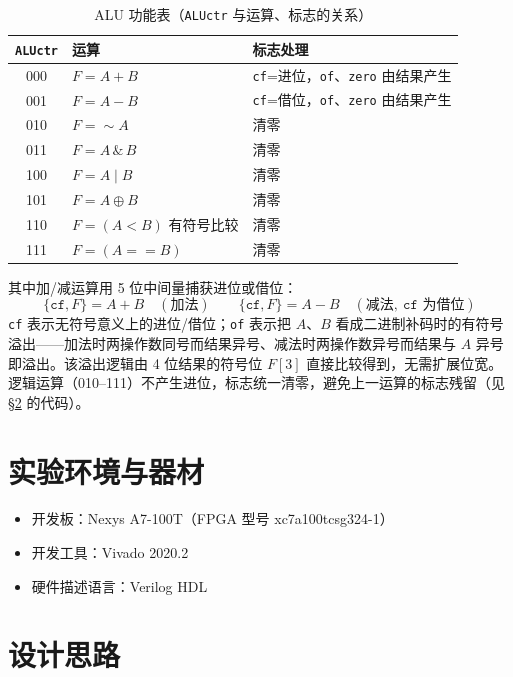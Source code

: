 \documentclass[12pt, a4paper]{ctexart}
\begin{document}
\begin{table}[htbp]
    \centering
    \caption{ALU 功能表（\texttt{ALUctr} 与运算、标志的关系）}
    \label{tab:alu}
    \begin{tabular}{cll}
        \hline
        \texttt{ALUctr} & 运算 & 标志处理 \\
        \hline
        000 & $F = A + B$        & \texttt{cf}=进位，\texttt{of}、\texttt{zero} 由结果产生 \\
        001 & $F = A - B$        & \texttt{cf}=借位，\texttt{of}、\texttt{zero} 由结果产生 \\
        010 & $F = \sim A$       & 清零 \\
        011 & $F = A \,\&\, B$   & 清零 \\
        100 & $F = A \mid B$     & 清零 \\
        101 & $F = A \oplus B$   & 清零 \\
        110 & $F = (A < B)$ 有符号比较 & 清零 \\
        111 & $F = (A == B)$     & 清零 \\
        \hline
    \end{tabular}
\end{table}

\noindent 其中加/减运算用 5 位中间量捕获进位或借位：
\begin{equation*}
    \{\texttt{cf}, F\} = A + B \quad(\text{加法})\qquad
    \{\texttt{cf}, F\} = A - B \quad(\text{减法},\ \texttt{cf}\text{ 为借位})
\end{equation*}
\texttt{cf} 表示无符号意义上的进位/借位；\texttt{of} 表示把 $A$、$B$ 看成二进制补码时的有符号溢出——加法时两操作数同号而结果异号、减法时两操作数异号而结果与 $A$ 异号即溢出。该溢出逻辑由 4 位结果的符号位 $F[3]$ 直接比较得到，无需扩展位宽。逻辑运算（010--111）不产生进位，标志统一清零，避免上一运算的标志残留（见 \S\ref{sec:design} 的代码）。

\section{实验环境与器材}
\begin{itemize}
    \item 开发板：Nexys A7-100T（FPGA 型号 xc7a100tcsg324-1）
    \item 开发工具：Vivado 2020.2
    \item 硬件描述语言：Verilog HDL
\end{itemize}

\section{设计思路}
\label{sec:design}
\end{document}
